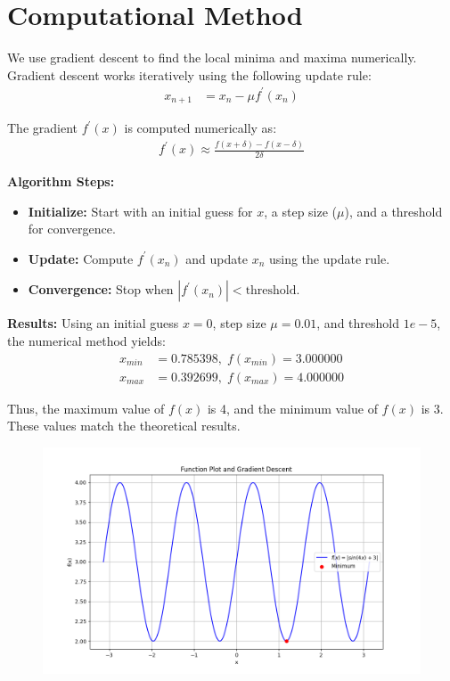 \documentclass[journal]{IEEEtran}
\begin{document}
\section*{Computational Method}
We use gradient descent to find the local minima and maxima numerically. Gradient descent works iteratively using the following update rule:
\begin{align}
    x_{n+1} &= x_n - \mu f^{\prime}(x_n)
\end{align}

The gradient \(f^{\prime}(x)\) is computed numerically as:
\begin{align}
    f^{\prime}(x) \approx \frac{f(x + \delta) - f(x - \delta)}{2\delta}
\end{align}

\noindent \textbf{Algorithm Steps:}
\begin{itemize}
    \item \textbf{Initialize:} Start with an initial guess for \(x\), a step size (\(\mu\)), and a threshold for convergence.
    \item \textbf{Update:} Compute \(f^{\prime}(x_n)\) and update \(x_n\) using the update rule.
    \item \textbf{Convergence:} Stop when \(|f^{\prime}(x_n)| < \text{threshold}\).
\end{itemize}

\noindent \textbf{Results:}
Using an initial guess \(x = 0\), step size \(\mu = 0.01\), and threshold \(1e-5\), the numerical method yields:
\begin{align}
    x_{min} &= 0.785398, \; f(x_{min}) = 3.000000\\
    x_{max} &= 0.392699, \; f(x_{max}) = 4.000000
\end{align}

Thus, the maximum value of \(f(x)\) is 4, and the minimum value of \(f(x)\) is 3. These values match the theoretical results.

\begin{figure}[h!]
   \centering
   \includegraphics[width=0.7\columnwidth]{figs/fig.png}
   \end{figure}
\end{document}
